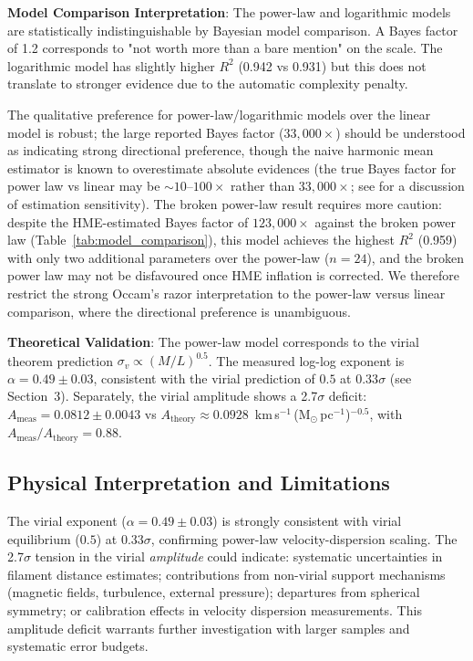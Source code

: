 \documentclass[usenatbib]{rasti}
\begin{document}
\textbf{Model Comparison Interpretation}: The power-law and logarithmic models are statistically indistinguishable by Bayesian model comparison. A Bayes factor of 1.2 corresponds to "not worth more than a bare mention" on the \citet{kass1995} scale. The logarithmic model has slightly higher $R^2$ (0.942 vs 0.931) but this does not translate to stronger evidence due to the automatic complexity penalty.

The qualitative preference for power-law/logarithmic models over the linear model is robust; the large reported Bayes factor ($33{,}000\times$) should be understood as indicating strong directional preference, though the naive harmonic mean estimator is known to overestimate absolute evidences (the true Bayes factor for power law vs linear may be $\sim 10$--$100\times$ rather than $33{,}000\times$; see \citet{kass1995} for a discussion of estimation sensitivity). The broken power-law result requires more caution: despite the HME-estimated Bayes factor of $123{,}000\times$ against the broken power law (Table~\ref{tab:model_comparison}), this model achieves the highest $R^2$ (0.959) with only two additional parameters over the power-law ($n = 24$), and the broken power law may not be disfavoured once HME inflation is corrected. We therefore restrict the strong Occam's razor interpretation to the power-law versus linear comparison, where the directional preference is unambiguous.

\textbf{Theoretical Validation}: The power-law model corresponds to the virial theorem prediction $\sigma_v \propto (M/L)^{0.5}$. The measured log-log exponent is $\alpha = 0.49 \pm 0.03$, consistent with the virial prediction of $0.5$ at $0.33\sigma$ (see Section~3). Separately, the virial amplitude shows a 2.7$\sigma$ deficit: $A_{\mathrm{meas}} = 0.0812 \pm 0.0043$ vs $A_{\mathrm{theory}} \approx 0.0928$~km\,s$^{-1}$\,(M$_{\odot}$\,pc$^{-1}$)$^{-0.5}$, with $A_{\mathrm{meas}}/A_{\mathrm{theory}} = 0.88$.

\subsection{Physical Interpretation and Limitations}

The virial exponent ($\alpha = 0.49 \pm 0.03$) is strongly consistent with virial equilibrium ($0.5$) at $0.33\sigma$, confirming power-law velocity-dispersion scaling. The 2.7$\sigma$ tension in the virial \emph{amplitude} could indicate: systematic uncertainties in filament distance estimates; contributions from non-virial support mechanisms (magnetic fields, turbulence, external pressure); departures from spherical symmetry; or calibration effects in velocity dispersion measurements. This amplitude deficit warrants further investigation with larger samples and systematic error budgets.
\end{document}
